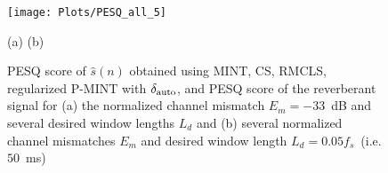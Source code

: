 \documentclass{article}
\begin{document}



\begin{figure}[t!]
\centering
\texttt{[image: Plots/PESQ\_all\_5]}

\hspace{0.7cm} (a) \hspace{3.3cm} (b)
\caption{PESQ score of $\hat{s}(n)$ obtained using  MINT, CS, RMCLS, regularized P-MINT with $\delta_{\rm auto}$, and PESQ score of the reverberant signal for (a) the normalized channel mismatch $E_m = -33$~dB and several desired window lengths $L_d$ and (b) several normalized channel mismatches $E_m$ and desired window length $L_d = 0.05 f_s$~(i.e. $50$~ms)}
\label{fig: pesqall}
\end{figure}
\balance
\end{document}
